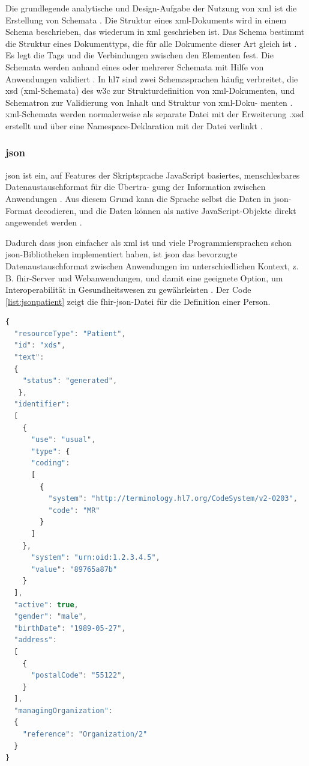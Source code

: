 Die grundlegende analytische und Design-Aufgabe der Nutzung von \ac{xml} ist die Erstellung von Schemata \cite{grundinfo}. Die Struktur eines \ac{xml}-Dokuments wird in einem Schema beschrieben, das wiederum in \ac{xml} geschrieben ist. Das Schema bestimmt die Struktur eines Dokumenttyps, die für alle Dokumente dieser Art gleich ist \cite{interop, grundinfo}. Es legt die Tags und die Verbindungen zwischen den Elementen fest. Die Schemata werden anhand eines oder mehrerer Schemata mit Hilfe von Anwendungen validiert \cite{grundinfo}. In \ac{hl7} sind zwei Schemasprachen häufig verbreitet, die \ac{xsd} (\ac{xml}-Schemata) des \ac{w3c} zur Strukturdefinition von \ac{xml}-Dokumenten, und Schematron zur Validierung von Inhalt und Struktur von \ac{xml}-Doku- menten \cite{interop}. \ac{xml}-Schemata werden normalerweise als separate Datei mit der Erweiterung .xsd erstellt und über eine Namespace-Deklaration mit der Datei verlinkt \cite{interop}.

\subsubsection{\acs{json}} \label{subsubsec:json}

\acf{json} ist ein, auf Features der Skriptsprache JavaScript basiertes, menschlesbares Datenaustauschformat für die Übertra- gung der Information zwischen Anwendungen \cite{jsondef}. Aus diesem Grund kann die Sprache selbst die Daten in \ac{json}-Format decodieren, und die Daten können als native JavaScript-Objekte direkt angewendet werden \cite{interop}. 

Dadurch dass \ac{json} einfacher als \ac{xml} ist und viele Programmiersprachen schon \ac{json}-Bibliotheken implementiert haben, ist \ac{json} das bevorzugte Datenaustauschformat zwischen Anwendungen im unterschiedlichen Kontext, z. B. \ac{fhir}-Server und Webanwendungen, und damit eine geeignete Option, um Interoperabilität in Gesundheitswesen zu gewährleisten \cite{interop, jsondef}. Der Code \ref{list:jsonpatient} zeigt die \ac{fhir}-\ac{json}-Datei für die Definition einer Person.

\begin{lstlisting}[caption={[Beispiel einer \acs{fhir}-Ressource in JSON] Beispiel einer \acs{fhir}-Ressource für eine Person in JSON.},language=JavaScript, label=list:jsonpatient, captionpos=b]
{
  "resourceType": "Patient",
  "id": "xds",
  "text": 
  {
    "status": "generated",
   },
  "identifier": 
  [
    {
      "use": "usual",
	  "type": {
	  "coding": 
	  [
	    {
	      "system": "http://terminology.hl7.org/CodeSystem/v2-0203",
	      "code": "MR"
	    }
	  ]
	},
	  "system": "urn:oid:1.2.3.4.5",
	  "value": "89765a87b"
	}
  ],
  "active": true,
  "gender": "male",
  "birthDate": "1989-05-27",
  "address": 
  [
    {	  
	  "postalCode": "55122",
	}
  ],
  "managingOrganization": 
  {
    "reference": "Organization/2"
  }
}
\end{lstlisting}

